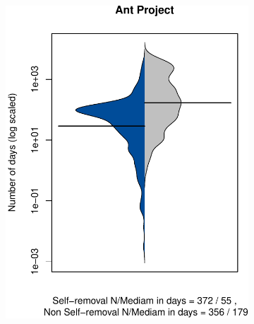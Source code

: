 




\begin{figure}[t]
	\centering
	
	
	\begin{subfigure}[b]{0.24\textwidth}
		\includegraphics[width=\textwidth]{figures/test/Ant.pdf}
		\label{fig:removal_comparison_gerrit}
	\end{subfigure}

\end{figure}
